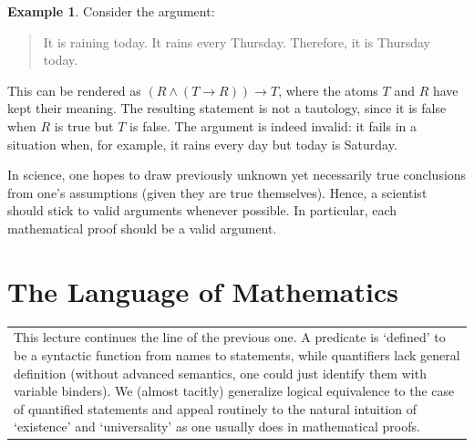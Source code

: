 \documentclass[12pt,notitlepage]{article}
\theoremstyle{plain}
\theoremstyle{definition}
\newtheorem{exm}[thm]{Example}
\theoremstyle{plain}
\newcommand{\1}{\mathbf{1}}
\newcommand{\0}{\mathbf{0}}
\newcommand{\mcomm}[1]{
\medskip\noindent\begin{tabular}{| l}
\parbox{0.99\textwidth}{{\small
#1 }}\end{tabular}
\smallskip}
\begin{document}
\begin{exm}
Consider the argument:
\begin{quote}
It is raining today. It rains every Thursday. Therefore, it is Thursday today.
\end{quote}
This can be rendered as $(R \wedge (T \to R)) \to T$, where the atoms $T$ and $R$ have kept their meaning. The resulting statement is not a tautology, since it is false when $R$ is true but $T$ is false. The argument is indeed invalid: it fails in a situation when, for example, it rains every day but today is Saturday.
\end{exm}

In science, one hopes to draw previously unknown yet necessarily true conclusions from one's assumptions (given they are true themselves). Hence, a scientist should stick to valid arguments whenever possible. In particular, each mathematical proof should be a valid argument.

\section{The Language of Mathematics}
\mcomm{This lecture continues the line of the previous one. A predicate is `defined' to be a syntactic function from names to statements, while quantifiers lack general definition (without advanced semantics, one could just identify them with variable binders). We (almost tacitly) generalize logical equivalence to the case of quantified statements and appeal routinely to the natural intuition of `existence' and `universality' as one usually does in mathematical proofs.}
\end{document}
